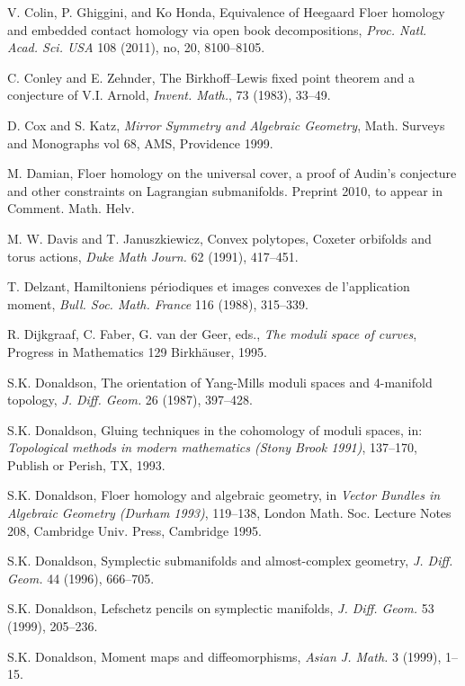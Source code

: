  V. Colin, P. Ghiggini, and Ko Honda, Equivalence of Heegaard Floer homology and embedded contact homology via open book decompositions, \emph{Proc. Natl. Acad. Sci. USA} 108 (2011), no, 20, 8100–8105.

 C. Conley and E. Zehnder, The Birkhoff–Lewis fixed point theorem and a conjecture of V.I. Arnold, \emph{Invent. Math.}, 73 (1983), 33–49.

 D. Cox and S. Katz, \emph{Mirror Symmetry and Algebraic Geometry}, Math. Surveys and Monographs vol 68, AMS, Providence 1999.

 M. Damian, Floer homology on the universal cover, a proof of Audin’s conjecture and other constraints on Lagrangian submanifolds. Preprint 2010, to appear in Comment. Math. Helv.

 M. W. Davis and T. Januszkiewicz, Convex polytopes, Coxeter orbifolds and torus actions, \emph{Duke Math Journ.} 62 (1991), 417–451.

 T. Delzant, Hamiltoniens périodiques et images convexes de l’application moment, \emph{Bull. Soc. Math. France} 116 (1988), 315–339.

 R. Dijkgraaf, C. Faber, G. van der Geer, eds., \emph{The moduli space of curves}, Progress in Mathematics 129 Birkhäuser, 1995.

 S.K. Donaldson, The orientation of Yang-Mills moduli spaces and 4-manifold topology, \emph{J. Diff. Geom.} 26 (1987), 397–428.

 S.K. Donaldson, Gluing techniques in the cohomology of moduli spaces, in: \emph{Topological methods in modern mathematics (Stony Brook 1991)}, 137–170, Publish or Perish, TX, 1993.

 S.K. Donaldson, Floer homology and algebraic geometry, in \emph{Vector Bundles in Algebraic Geometry (Durham 1993)}, 119–138, London Math. Soc. Lecture Notes 208, Cambridge Univ. Press, Cambridge 1995.

 S.K. Donaldson, Symplectic submanifolds and almost-complex geometry, \emph{J. Diff. Geom.} 44 (1996), 666–705.

 S.K. Donaldson, Lefschetz pencils on symplectic manifolds, \emph{J. Diff. Geom.} 53 (1999), 205–236.

 S.K. Donaldson, Moment maps and diffeomorphisms, \emph{Asian J. Math.} 3 (1999), 1–15.

